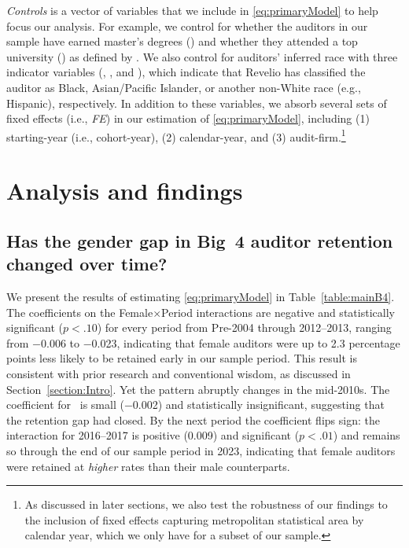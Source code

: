 \documentclass[11pt]{article}
\begin{document}
        \textit{Controls} is a vector of variables that we include in \ref{eq:primaryModel} to help focus our analysis. For example, we control for whether the auditors in our sample have earned master's degrees (\MASTERS) and whether they attended a top university (\TOPUNIV) as defined by \textcite{FGH2022}. We also control for auditors' inferred race with three indicator variables (\BLACKRACE, \APIRACE, and \OTHERRACE), which indicate that Revelio has classified the auditor as Black, Asian/Pacific Islander, or another non-White race (e.g., Hispanic), respectively. In addition to these variables, we absorb several sets of fixed effects (i.e., \textit{FE}) in our estimation of \ref{eq:primaryModel}, including (1) starting-year (i.e., cohort-year), (2) calendar-year, and (3) audit-firm.\footnote{As discussed in later sections, we also test the robustness of our findings to the inclusion of fixed effects capturing metropolitan statistical area by calendar year, which we only have for a subset of our sample.}

\section{Analysis and findings}\label{section:analysis}

    \subsection{Has the gender gap in Big~4 auditor retention changed over time?}\label{section:primaryResults}
        We present the results of estimating \ref{eq:primaryModel} in Table~\ref{table:mainB4}. The coefficients on the Female$\times$Period interactions are negative and statistically significant ($p<.10$) for every period from Pre-2004 through 2012--2013, ranging from $-$0.006 to $-$0.023, indicating that female auditors were up to 2.3 percentage points less likely to be retained early in our sample period. This result is consistent with prior research and conventional wisdom, as discussed in Section~\ref{section:Intro}. Yet the pattern abruptly changes in the mid-2010s. The coefficient for \FEMALExXIVtoXV\ is small ($-$0.002) and statistically insignificant, suggesting that the retention gap had closed. By the next period the coefficient flips sign: the interaction for 2016--2017 is positive (0.009) and significant ($p<.01$) and remains so through the end of our sample period in 2023, indicating that female auditors were retained at \textit{higher} rates than their male counterparts.
\end{document}
